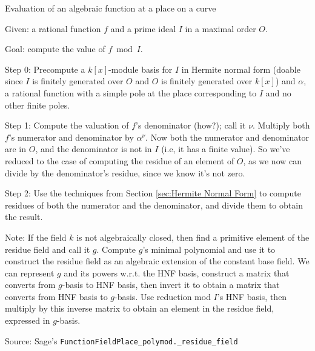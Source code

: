 \begin{mdframed}[backgroundcolor=yellow!20]
\begin{algorithm} Evaluation of an algebraic function at a place on a curve
\rm

Given: a rational function $f$ and a prime ideal $I$ in a maximal order $O$.

Goal: compute the value of $f \bmod I$.

Step 0: Precompute a $k[x]$-module basis for $I$ in Hermite normal form (doable since $I$ is finitely generated over $O$ and $O$ is finitely generated over $k[x]$) and $\alpha$, a rational function with a simple pole at the place corresponding to $I$ and no other finite poles.

Step 1: Compute the valuation of $f$'s denominator (how?); call it $\nu$.  Multiply both $f$'s numerator and denominator by $\alpha^\nu$.  Now both the numerator and denominator are in $O$, and the denominator is not in $I$ (i.e, it has a finite value).  So we've reduced to the case of computing the residue of an element of $O$, as we now can divide by the denominator's residue, since we know it's not zero.

Step 2: Use the techniques from Section \ref{sec:Hermite Normal Form} to compute residues of both the numerator
and the denominator, and divide them to obtain the result.

Note: If the field $k$ is not algebraically closed, then find a primitive element of the residue field and call it $g$.
Compute $g$'s minimal polynomial and use it to construct the residue field as an algebraic extension of the constant base field.
We can represent $g$ and its powers w.r.t. the HNF basis, construct a
matrix that converts from $g$-basis to HNF basis, then invert it to
obtain a matrix that converts from HNF basis to $g$-basis.
Use reduction mod $I$'s HNF basis, then multiply by this inverse matrix to obtain an element in the residue field,
expressed in $g$-basis.



Source: Sage's {\tt FunctionFieldPlace_polymod._residue_field}
\end{algorithm}
\end{mdframed}

